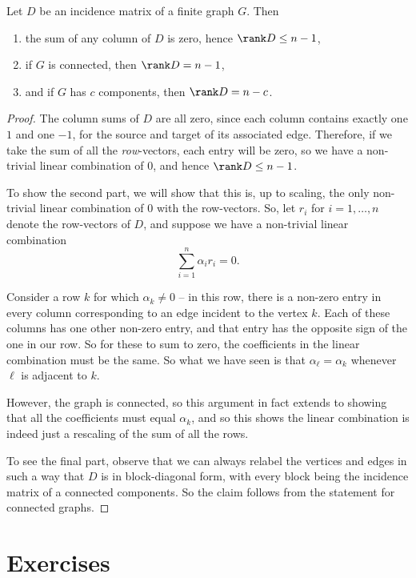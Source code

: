 \documentclass[nobib]{tufte-handout}
\begin{document}
\begin{lemma}
    Let $D$ be an incidence matrix of a finite graph $G$. Then
    \begin{enumerate}
        \item the sum of any column of $D$ is zero, hence $\rank D \leq n - 1$,
        \item if $G$ is connected, then $\rank D = n - 1$,
        \item and if $G$ has $c$ components, then $\rank D = n - c$.
    \end{enumerate}

    \begin{proof}
        The column sums of $D$ are all zero, since each column contains exactly one $1$ and one $-1$, for the source and target of its associated edge. Therefore, if we take the sum of all the \emph{row}-vectors, each entry will be zero, so we have a non-trivial linear combination of $0$, and hence $\rank D \leq n - 1$.

        To show the second part, we will show that this is, up to scaling, the only non-trivial linear combination of $0$ with the row-vectors. So, let $r_i$ for $i = 1,\ldots,n$ denote the row-vectors of $D$, and suppose we have a non-trivial linear combination
        $$\sum_{i=1}^n \alpha_i r_i = 0.$$

        Consider a row $k$ for which $\alpha_k \neq 0$ -- in this row, there is a non-zero entry in every column corresponding to an edge incident to the vertex $k$. Each of these columns has one other non-zero entry, and that entry has the opposite sign of the one in our row. So for these to sum to zero, the coefficients in the linear combination must be the same. So what we have seen is that $\alpha_\ell = \alpha_k$ whenever $\ell$ is adjacent to $k$.

        However, the graph is connected, so this argument in fact extends to showing that all the coefficients must equal $\alpha_k$, and so this shows the linear combination is indeed just a rescaling of the sum of all the rows.

        To see the final part, observe that we can always relabel the vertices and edges in such a way that $D$ is in block-diagonal form, with every block being the incidence matrix of a connected components. So the claim follows from the statement for connected graphs.
    \end{proof}
\end{lemma}

\section{Exercises}

%
%
\end{document}
